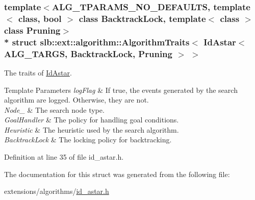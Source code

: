 \subsubsection*{template$<$A\+L\+G\+\_\+\+T\+P\+A\+R\+A\+M\+S\+\_\+\+N\+O\+\_\+\+D\+E\+F\+A\+U\+L\+TS, template$<$ class, bool $>$ class Backtrack\+Lock, template$<$ class $>$ class Pruning$>$\\*
struct slb\+::ext\+::algorithm\+::\+Algorithm\+Traits$<$ Id\+Astar$<$ A\+L\+G\+\_\+\+T\+A\+R\+G\+S, Backtrack\+Lock, Pruning $>$ $>$}

The traits of \hyperlink{structslb_1_1ext_1_1algorithm_1_1IdAstar}{Id\+Astar}. 


\begin{DoxyTemplParams}{Template Parameters}
{\em log\+Flag} & If {\ttfamily true}, the events generated by the search algorithm are logged. Otherwise, they are not. \\
\hline
{\em Node\+\_\+} & The search node type. \\
\hline
{\em Goal\+Handler} & The policy for handling goal conditions. \\
\hline
{\em Heuristic} & The heuristic used by the search algorithm. \\
\hline
{\em Backtrack\+Lock} & The locking policy for backtracking. \\
\hline
\end{DoxyTemplParams}


Definition at line 35 of file id\+\_\+astar.\+h.



The documentation for this struct was generated from the following file\+:\begin{DoxyCompactItemize}
\item 
extensions/algorithms/\hyperlink{id__astar_8h}{id\+\_\+astar.\+h}\end{DoxyCompactItemize}

